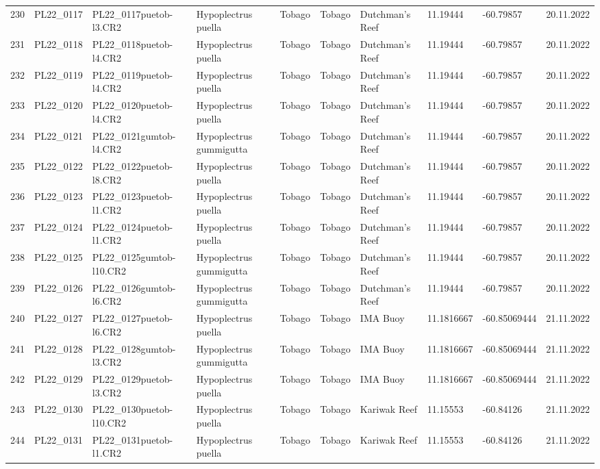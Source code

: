 \begin{table}[ht]
\begin{tabular}{rlllllllll}
  230 & PL22\_0117 & PL22\_0117puetob-l3.CR2 & Hypoplectrus puella & Tobago & Tobago & Dutchman's Reef & 11.19444 & -60.79857 & 20.11.2022 \\ 
  231 & PL22\_0118 & PL22\_0118puetob-l4.CR2 & Hypoplectrus puella & Tobago & Tobago & Dutchman's Reef & 11.19444 & -60.79857 & 20.11.2022 \\ 
  232 & PL22\_0119 & PL22\_0119puetob-l4.CR2 & Hypoplectrus puella & Tobago & Tobago & Dutchman's Reef & 11.19444 & -60.79857 & 20.11.2022 \\ 
  233 & PL22\_0120 & PL22\_0120puetob-l4.CR2 & Hypoplectrus puella & Tobago & Tobago & Dutchman's Reef & 11.19444 & -60.79857 & 20.11.2022 \\ 
  234 & PL22\_0121 & PL22\_0121gumtob-l4.CR2 & Hypoplectrus gummigutta & Tobago & Tobago & Dutchman's Reef & 11.19444 & -60.79857 & 20.11.2022 \\ 
  235 & PL22\_0122 & PL22\_0122puetob-l8.CR2 & Hypoplectrus puella & Tobago & Tobago & Dutchman's Reef & 11.19444 & -60.79857 & 20.11.2022 \\ 
  236 & PL22\_0123 & PL22\_0123puetob-l1.CR2 & Hypoplectrus puella & Tobago & Tobago & Dutchman's Reef & 11.19444 & -60.79857 & 20.11.2022 \\ 
  237 & PL22\_0124 & PL22\_0124puetob-l1.CR2 & Hypoplectrus puella & Tobago & Tobago & Dutchman's Reef & 11.19444 & -60.79857 & 20.11.2022 \\ 
  238 & PL22\_0125 & PL22\_0125gumtob-l10.CR2 & Hypoplectrus gummigutta & Tobago & Tobago & Dutchman's Reef & 11.19444 & -60.79857 & 20.11.2022 \\ 
  239 & PL22\_0126 & PL22\_0126gumtob-l6.CR2 & Hypoplectrus gummigutta & Tobago & Tobago & Dutchman's Reef & 11.19444 & -60.79857 & 20.11.2022 \\ 
  240 & PL22\_0127 & PL22\_0127puetob-l6.CR2 & Hypoplectrus puella & Tobago & Tobago & IMA Buoy & 11.1816667 & -60.85069444 & 21.11.2022 \\ 
  241 & PL22\_0128 & PL22\_0128gumtob-l3.CR2 & Hypoplectrus gummigutta & Tobago & Tobago & IMA Buoy & 11.1816667 & -60.85069444 & 21.11.2022 \\ 
  242 & PL22\_0129 & PL22\_0129puetob-l3.CR2 & Hypoplectrus puella & Tobago & Tobago & IMA Buoy & 11.1816667 & -60.85069444 & 21.11.2022 \\ 
  243 & PL22\_0130 & PL22\_0130puetob-l10.CR2 & Hypoplectrus puella & Tobago & Tobago & Kariwak Reef & 11.15553 & -60.84126 & 21.11.2022 \\ 
  244 & PL22\_0131 & PL22\_0131puetob-l1.CR2 & Hypoplectrus puella & Tobago & Tobago & Kariwak Reef & 11.15553 & -60.84126 & 21.11.2022 \\ 

\end{tabular}
\end{table}
